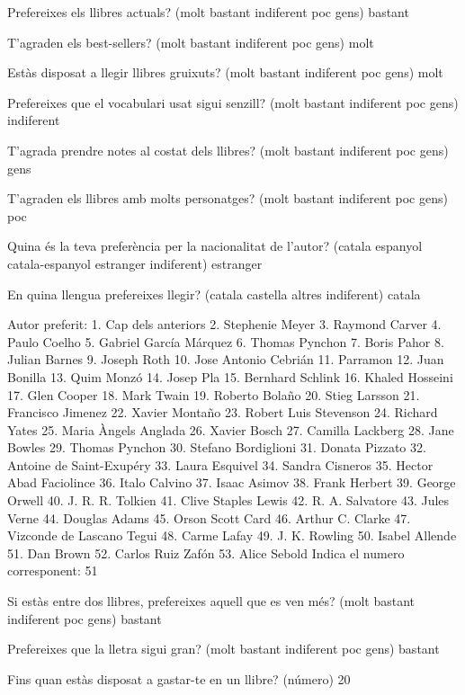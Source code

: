 Prefereixes els llibres actuals? (molt bastant indiferent poc gens) bastant

T'agraden els best-sellers? (molt bastant indiferent poc gens) molt

Estàs disposat a llegir llibres gruixuts? (molt bastant indiferent poc gens) molt

Prefereixes que el vocabulari usat sigui senzill? (molt bastant indiferent poc gens) indiferent

T'agrada prendre notes al costat dels llibres? (molt bastant indiferent poc gens) gens

T'agraden els llibres amb molts personatges? (molt bastant indiferent poc gens) poc

Quina és la teva preferència per la nacionalitat de l'autor? (catala espanyol catala-espanyol estranger indiferent) estranger

En quina llengua prefereixes llegir? (catala castella altres indiferent) catala

Autor preferit: 
  1. Cap dels anteriors
  2. Stephenie Meyer
  3. Raymond Carver
  4. Paulo Coelho
  5. Gabriel García Márquez
  6. Thomas Pynchon
  7. Boris Pahor
  8. Julian Barnes
  9. Joseph Roth
  10. Jose Antonio Cebrián
  11. Parramon
  12. Juan Bonilla
  13. Quim Monzó
  14. Josep Pla
  15. Bernhard Schlink
  16. Khaled Hosseini
  17. Glen Cooper
  18. Mark Twain
  19. Roberto Bolaño
  20. Stieg Larsson
  21. Francisco Jimenez
  22. Xavier Montaño
  23. Robert Luis Stevenson
  24. Richard Yates
  25. Maria Àngels Anglada
  26. Xavier Bosch
  27. Camilla Lackberg
  28. Jane Bowles
  29. Thomas Pynchon
  30. Stefano Bordiglioni
  31. Donata Pizzato
  32. Antoine de Saint-Exupéry
  33. Laura Esquivel
  34. Sandra Cisneros
  35. Hector Abad Faciolince
  36. Italo Calvino
  37. Isaac Asimov
  38. Frank Herbert
  39. George Orwell
  40. J. R. R. Tolkien
  41. Clive Staples Lewis
  42. R. A. Salvatore
  43. Jules Verne
  44. Douglas Adams
  45. Orson Scott Card
  46. Arthur C. Clarke
  47. Vizconde de Lascano Tegui
  48. Carme Lafay
  49. J. K. Rowling
  50. Isabel Allende
  51. Dan Brown
  52. Carlos Ruiz Zafón
  53. Alice Sebold
Indica el numero corresponent: 51

Si estàs entre dos llibres, prefereixes aquell que es ven més? (molt bastant indiferent poc gens) bastant

Prefereixes que la lletra sigui gran? (molt bastant indiferent poc gens) bastant

Fins quan estàs disposat a gastar-te en un llibre? (número) 20

